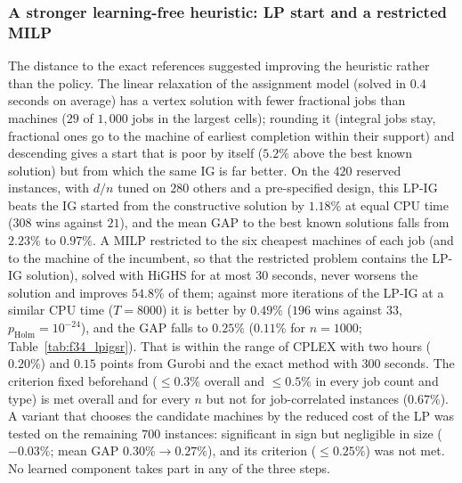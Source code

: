 

\subsubsection*{A stronger learning-free heuristic: LP start and a restricted MILP}
The distance to the exact references suggested improving the heuristic rather than the policy. The linear relaxation of the assignment model (solved in $0.4$ seconds on average) has a vertex solution with
fewer fractional jobs than machines ($29$ of $1{,}000$ jobs in the largest cells); rounding it (integral jobs stay, fractional ones go to the machine of earliest completion within their support) and descending gives a start that is
poor by itself ($5.2\%$ above the best known solution) but from which the same IG is far better. On the $420$ reserved instances, with $d/n$ tuned on $280$ others and a pre-specified design, this LP-IG beats the IG started
from the constructive solution by $1.18\%$ at equal CPU time ($308$ wins against $21$), and the mean GAP to the best known solutions falls from $2.23\%$ to $0.97\%$. A MILP restricted to the six cheapest machines of each job (and to the
machine of the incumbent, so that the restricted problem contains the LP-IG solution), solved with HiGHS for at most $30$ seconds, never worsens the solution and improves $54.8\%$ of them; against more iterations of the LP-IG at a
similar CPU time ($T=8000$) it is better by $0.49\%$ ($196$ wins against $33$, $p_{\mathrm{Holm}}=10^{-24}$), and the GAP falls to $0.25\%$ ($0.11\%$ for $n=1000$; Table~\ref{tab:f34_lpigsr}). That is within the range of CPLEX with two hours
($0.20\%$) and $0.15$ points from Gurobi and the exact method with $300$ seconds. The criterion fixed beforehand ($\leq0.3\%$ overall and $\leq0.5\%$ in every job count and type) is met overall and for every $n$ but not for
job-correlated instances ($0.67\%$). A variant that chooses the candidate machines by the reduced cost of the LP was tested on the remaining $700$ instances: significant in sign but negligible in size ($-0.03\%$;
mean GAP $0.30\%\to0.27\%$), and its criterion ($\leq0.25\%$) was not met. No learned component takes part in any of the three steps.


